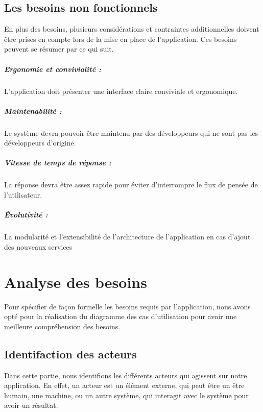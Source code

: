 \subsection{Les besoins non fonctionnels}

En plus des besoins, plusieurs considérations et contraintes additionnelles doivent être prises en compte lors de la mise en place de l’application. Ces besoins peuvent se résumer par ce qui suit.

\subparagraph{Ergonomie et convivialité :} L'application doit présenter une interface claire conviviale et ergonomique.
\subparagraph{Maintenabilité :}Le système devra pouvoir être maintenu par des développeurs qui ne sont pas les développeurs d’origine.
\subparagraph{Vitesse de temps de réponse :}La réponse devra être assez rapide pour éviter d’interrompre le flux de pensée de l’utilisateur.
\subparagraph{Évolutivité :}La modularité et l'extensibilité de l'architecture de l'application en cas d'ajout des nouveaux services
\section{Analyse des besoins}

Pour spécifier de façon formelle les besoins requis par l’application, nous avons opté pour la réalisation du diagramme des cas d’utilisation pour avoir une meilleure compréhension des besoins.

\subsection{Identifaction des acteurs}

Dans cette partie, nous identifions les différents acteurs qui agissent sur notre application. En effet, un acteur est un élément externe, qui peut être un être humain, une machine, ou un autre système, qui interagit avec le système pour avoir un résultat.\\

